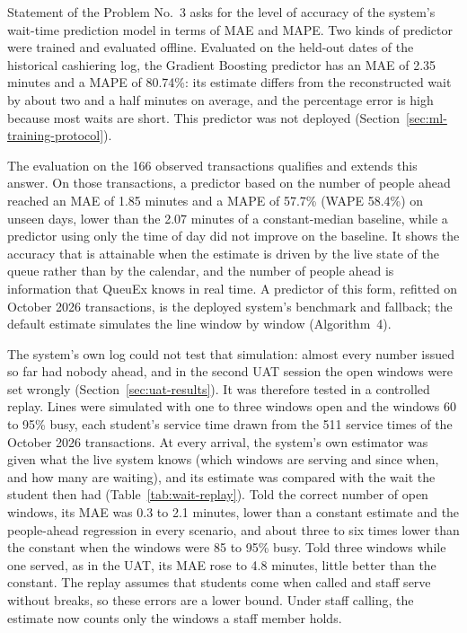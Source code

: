 \documentclass{research}
\newcommand{\sysname}{QueuEx}
\begin{document}
Statement of the Problem No.~3 asks for the level of accuracy of the
system's wait-time prediction model in terms of MAE and MAPE. Two kinds
of predictor were trained and evaluated offline. Evaluated on the
held-out dates of the historical cashiering log, the Gradient Boosting
predictor has an MAE of 2.35 minutes and a MAPE of 80.74\%: its estimate
differs from the reconstructed wait by about two and a half minutes on
average, and the percentage error is high because most waits are short.
This predictor was not deployed (Section~\ref{sec:ml-training-protocol}).

The evaluation on the 166 observed transactions qualifies and extends
this answer. On those transactions, a predictor based on the number of
people ahead reached an MAE of 1.85 minutes and a MAPE of 57.7\% (WAPE
58.4\%) on unseen days, lower than the 2.07 minutes of a constant-median
baseline, while a predictor using only the time of day did not improve
on the baseline. It shows the accuracy that is attainable when the
estimate is driven by the live state of the queue rather than by the
calendar, and the number of people ahead is information that \sysname{}
knows in real time. A predictor of this form, refitted on October 2026
transactions, is the deployed system's benchmark and fallback; the
default estimate simulates the line window by window (Algorithm~4).

The system's own log could not test that simulation: almost every number
issued so far had nobody ahead, and in the second UAT session the open
windows were set wrongly (Section~\ref{sec:uat-results}). It was
therefore tested in a controlled replay. Lines were simulated with one to
three windows open and the windows 60 to 95\% busy, each student's
service time drawn from the 511 service times of the October 2026
transactions. At every arrival, the system's own estimator was given
what the live system knows (which windows are serving and since when,
and how many are waiting), and its estimate was compared with the wait
the student then had (Table~\ref{tab:wait-replay}). Told the correct
number of open windows, its MAE was 0.3 to 2.1 minutes, lower than a
constant estimate and the people-ahead regression in every scenario, and
about three to six times lower than the constant when the windows were
85 to 95\% busy. Told three windows while one served, as in the UAT, its
MAE rose to 4.8 minutes, little better than the constant. The replay
assumes that students come when called and staff serve without breaks,
so these errors are a lower bound. Under staff calling, the estimate now
counts only the windows a staff member holds.
\end{document}
